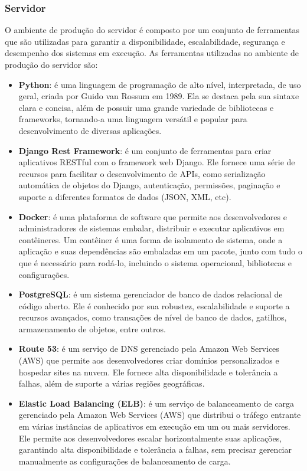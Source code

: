 \subsubsection{Servidor}

O ambiente de produção do servidor é composto por um conjunto de ferramentas que são utilizadas para garantir a disponibilidade, escalabilidade, segurança e desempenho dos sistemas em execução. As ferramentas utilizadas no ambiente de produção do servidor são:

\begin{itemize} \label{itemize:server_production}
    \item \textbf{Python}: é uma linguagem de programação de alto nível, interpretada, de uso geral, criada por Guido van Rossum em 1989. Ela se destaca pela sua sintaxe clara e concisa, além de possuir uma grande variedade de bibliotecas e frameworks, tornando-a uma linguagem versátil e popular para desenvolvimento de diversas aplicações.
    \item \textbf{Django Rest Framework}: é um conjunto de ferramentas para criar aplicativos RESTful com o framework web Django. Ele fornece uma série de recursos para facilitar o desenvolvimento de APIs, como serialização automática de objetos do Django, autenticação, permissões, paginação e suporte a diferentes formatos de dados (JSON, XML, etc).
    \item \textbf{Docker}: é uma plataforma de software que permite aos desenvolvedores e administradores de sistemas embalar, distribuir e executar aplicativos em contêineres. Um contêiner é uma forma de isolamento de sistema, onde a aplicação e suas dependências são embaladas em um pacote, junto com tudo o que é necessário para rodá-lo, incluindo o sistema operacional, bibliotecas e configurações.
    \item \textbf{PostgreSQL}: é um sistema gerenciador de banco de dados relacional de código aberto. Ele é conhecido por sua robustez, escalabilidade e suporte a recursos avançados, como transações de nível de banco de dados, gatilhos, armazenamento de objetos, entre outros.
    \item \textbf{Route 53}: é um serviço de DNS gerenciado pela Amazon Web Services (AWS) que permite aos desenvolvedores criar domínios personalizados e hospedar sites na nuvem. Ele fornece alta disponibilidade e tolerância a falhas, além de suporte a várias regiões geográficas.
    \item \textbf{Elastic Load Balancing (ELB)}: é um serviço de balanceamento de carga gerenciado pela Amazon Web Services (AWS) que distribui o tráfego entrante em várias instâncias de aplicativos em execução em um ou mais servidores. Ele permite aos desenvolvedores escalar horizontalmente suas aplicações, garantindo alta disponibilidade e tolerância a falhas, sem precisar gerenciar manualmente as configurações de balanceamento de carga.

\end{itemize}

